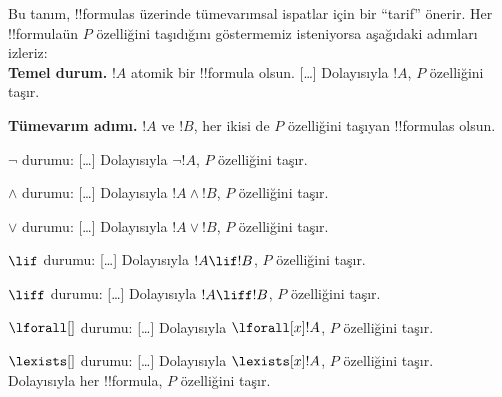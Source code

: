 \begin{explain}
Bu tanım, !!{formula}s üzerinde tümevarımsal ispatlar için bir ``tarif''
önerir. Her !!{formula}{}ün $P$ özelliğini taşıdığını göstermemiz isteniyorsa
aşağıdaki adımları izleriz:\\

\textbf{Temel durum.} $!A$ atomik bir !!{formula} olsun. [\ldots]
Dolayısıyla $!A$, $P$ özelliğini taşır.

\textbf{Tümevarım adımı.} $!A$ ve $!B$, her ikisi de $P$ özelliğini taşıyan
!!{formula}s olsun.

$\lnot$ durumu: [\ldots] Dolayısıyla $\lnot !A$, $P$ özelliğini taşır.

$\land$ durumu: [\ldots] Dolayısıyla $!A \land !B$, $P$ özelliğini taşır.

$\lor$ durumu: [\ldots] Dolayısıyla $!A \lor !B$, $P$ özelliğini taşır.

$\lif$ durumu: [\ldots] Dolayısıyla $!A \lif !B$, $P$ özelliğini taşır.

$\liff$ durumu: [\ldots] Dolayısıyla $!A \liff !B$, $P$ özelliğini taşır.

$\lforall[]$ durumu: [\ldots] Dolayısıyla $\lforall[x] !A$, $P$ özelliğini taşır.

$\lexists[]$ durumu: [\ldots] Dolayısıyla $\lexists[x] !A$, $P$ özelliğini taşır. \\

Dolayısıyla her !!{formula}, $P$ özelliğini taşır.
\end{explain}

